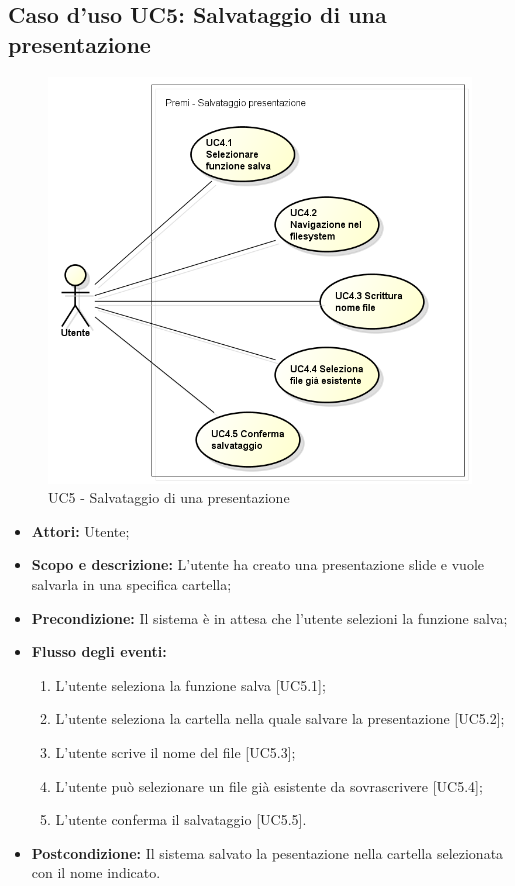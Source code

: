 \subsection{Caso d'uso UC5: Salvataggio di una presentazione}
\begin{figure}[h] 
	\centering 
	\includegraphics[scale=0.45] {img/UC5.png} 
	\caption{UC5 - Salvataggio di una presentazione} 
\end{figure}

\begin{itemize}
	\item \textbf{Attori:} Utente;
	\item \textbf{Scopo e descrizione:} L'utente ha creato una presentazione slide e vuole salvarla in una specifica cartella;
	\item \textbf{Precondizione:} Il sistema è in attesa che l'utente selezioni la funzione salva;
	\item \textbf{Flusso degli eventi:}
	\begin{enumerate}
		\item L'utente seleziona la funzione salva [UC5.1];
		\item L'utente seleziona la cartella nella quale salvare la presentazione [UC5.2];
		\item L'utente scrive il nome del file [UC5.3];
		\item L'utente può selezionare un file già esistente da sovrascrivere [UC5.4];
		\item L'utente conferma il salvataggio [UC5.5].
	\end{enumerate}
	\item \textbf{Postcondizione:} Il sistema salvato la pesentazione nella cartella selezionata con il nome indicato.
\end{itemize}

